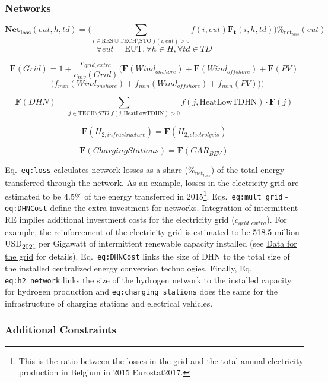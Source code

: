 \documentclass[
]{article}
\begin{document}
\subsubsection{Networks}\label{networks}

{\[\textbf{Net}_\textbf{loss}(eut,h,td) = \Big(\sum_{i \in \text{RES} \cup \text{TECH} \setminus \text{STO} | f(i,eut) > 0} f(i,eut)\textbf{F}_\textbf{t}(i,h,td) \Big) \%_{\text{net}_{loss}} (eut)\]\[\forall eut = \text{EUT}, \forall h \in H, \forall td \in TD\]}

{\[\textbf{F} (Grid) = 1 + \frac{c_{grid,extra}}{c_{inv}(Grid)} 
\Big(
\textbf{F}(Wind_{onshore}) + \textbf{F}(Wind_{offshore}) + \textbf{F}(PV)\]\[-\big( 
f_{min}(Wind_{onshore}) + f_{min}(Wind_{offshore}) + f_{min}(PV)
\big)
\Big)\]}

{\[\textbf{F} (DHN) = \sum_{j \in \text{TECH} \setminus {STO} | f(j,\text{HeatLowTDHN}) >0} f(j,\text{HeatLowTDHN}) \cdot \textbf{F} (j)\]}

{\[\textbf{F} (H_{2,infrastructure}) = \textbf{F} (H_{2,electrolysis})\]}

{\[\textbf{F} (ChargingStations) = \textbf{F} (CAR_{BEV})\]}

Eq.~\texttt{eq:loss} calculates network losses as a share
(\(\%_{\text{net}_{loss}}\)) of the total energy transferred through the
network. As an example, losses in the electricity grid are estimated to
be 4.5\% of the energy transferred in 2015\footnote{This is the ratio
  between the losses in the grid and the total annual electricity
  production in Belgium in 2015 Eurostat2017.}.
Eqs.~\texttt{eq:mult\_grid} - \texttt{eq:DHNCost} define the extra
investment for networks. Integration of intermittent RE implies
additional investment costs for the electricity grid
(\(c_{grid,ewtra}\)). For example, the reinforcement of the electricity
grid is estimated to be 518.5 million USD\textsubscript{2021} per
Gigawatt of intermittent renewable capacity installed (see
\hyperref[ssec:app1_grid:]{Data for the grid} for details).
Eq.~\texttt{eq:DHNCost} links the size of DHN to the total size of the
installed centralized energy conversion technologies. Finally, Eq.
\texttt{eq:h2\_network} links the size of the hydrogen network to the
installed capacity for hydrogen production and
\texttt{eq:charging\_stations} does the same for the infrastructure of
charging stations and electrical vehicles.

\subsubsection{Additional Constraints}\label{additional-constraints}
\end{document}
